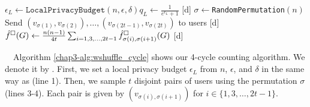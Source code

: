 \setlength{\algomargin}{5mm}
\begin{algorithm}[t]
  \SetAlgoLined
  $\epsilon_L \leftarrow \texttt{LocalPrivacyBudget}(n,\epsilon,\delta)$\;
  [d] $q_L \leftarrow \frac{1}{e^{\epsilon_L}+1}$\;
  [d] $\sigma \leftarrow$\texttt{RandomPermutation}$(n)$\;
  [d] Send $(v_{\sigma(1)}, v_{\sigma(2)}), \ldots, (v_{\sigma(2t-1)}, v_{\sigma(2t)})$ to users\;
  [d] $\hat{f}^\square(G) \leftarrow \frac{n(n-1)}{4t}\sum_{i=1,3,\ldots,2t-1} \hat{f}_{\sigma(i),\sigma(i+1)}^\square(G)$\;
  [d] 
  \caption{Our 4-cycle counting algorithm \AlgWSCyc{}.
  \AlgWS{} is shown in Algorithm~\ref{chap3-alg:WShuffle}.
  }\label{chap3-alg:wshuffle_cycle}
\end{algorithm}

~~Algorithm \ref{chap3-alg:wshuffle_cycle} shows our 4-cycle counting algorithm. 
We denote it by \AlgWSCyc{}. 
First, we set a local privacy budget $\epsilon_L$ from $n$, $\epsilon$, and $\delta$ in the same way as \AlgWSLE{} (line 1). 
Then, we sample $t$ disjoint pairs of users using the permutation $\sigma$ (lines 3-4). 
Each pair is given by $(v_{\sigma(i), \sigma(i+1)})$ for $i \in \{1, 3, \ldots, 2t-1\}$.

